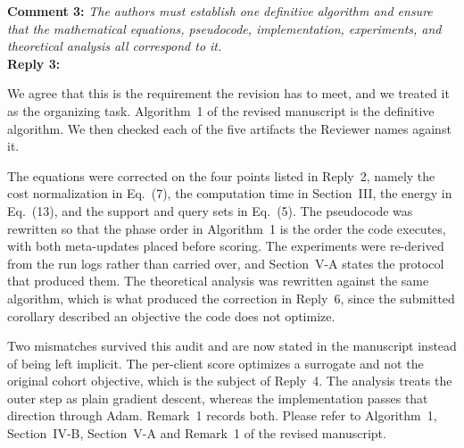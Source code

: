 \documentclass[10pt]{article}
\begin{document}
\noindent
\textbf{Comment 3:} \textit{The authors must establish one definitive algorithm and ensure that the mathematical equations, pseudocode, implementation, experiments, and theoretical analysis all correspond to it.}\\
\noindent
\textbf{Reply 3:} {We agree that this is the requirement the revision has to meet, and we treated it as the organizing task. Algorithm~1 of the revised manuscript is the definitive algorithm. We then checked each of the five artifacts the Reviewer names against it.

The equations were corrected on the four points listed in Reply~2, namely the cost normalization in Eq.~(7), the computation time in Section~III, the energy in Eq.~(13), and the support and query sets in Eq.~(5). The pseudocode was rewritten so that the phase order in Algorithm~1 is the order the code executes, with both meta-updates placed before scoring. The experiments were re-derived from the run logs rather than carried over, and Section~V-A states the protocol that produced them. The theoretical analysis was rewritten against the same algorithm, which is what produced the correction in Reply~6, since the submitted corollary described an objective the code does not optimize.

Two mismatches survived this audit and are now stated in the manuscript instead of being left implicit. The per-client score optimizes a surrogate and not the original cohort objective, which is the subject of Reply~4. The analysis treats the outer step as plain gradient descent, whereas the implementation passes that direction through Adam. Remark~1 records both. Please refer to Algorithm~1, Section~IV-B, Section~V-A and Remark~1 of the revised manuscript.}\\
\end{document}
